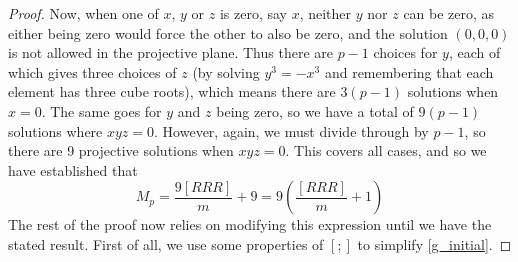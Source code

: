 \begin{proof}
Now, when one of $x$, $y$ or $z$ is zero, say $x$, neither $y$ nor $z$ can be zero, as either being zero would force the other to also be zero, and the solution $(0,0,0)$ is not allowed in the projective plane.
Thus there are $p-1$ choices for $y$, each of which gives three choices of $z$ (by solving $y^3 = -x^3$ and remembering that each element has three cube roots), which means there are $3(p-1)$ solutions when $x=0$.
The same goes for $y$ and $z$ being zero, so we have a total of $9(p-1)$ solutions where $xyz=0$.
However, again, we must divide through by $p-1$, so there are 9 projective solutions when $xyz=0$.
This covers all cases, and so we have established that
\begin{equation}
M_p = \frac{9[RRR]}{m} + 9 = 9 \left(\frac{[RRR]}{m}+1\right) \label{g_initial}
\end{equation}
The rest of the proof now relies on modifying this expression until we have the stated result.
First of all, we use some properties of $[;]$ to simplify \eqref{g_initial}.


\end{proof}
